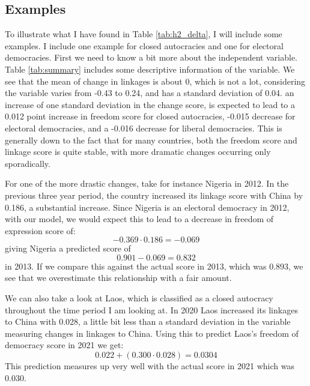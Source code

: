 \subsection{Examples}
To illustrate what I have found in Table \ref{tab:h2_delta}, I will include some examples. I include one example for closed autocracies and one for electoral democracies. First we need to know a bit more about the independent variable. Table \ref{tab:summary} includes some descriptive information of the variable. We see that the mean of change in linkages is about 0, which is not a lot, considering the variable varies from -0.43 to 0.24, and has a standard deviation of 0.04. an increase of one standard deviation in the change score, is expected to lead to a 0.012 point increase in freedom score for closed autocracies, -0.015 decrease for electoral democracies, and a -0.016 decrease for liberal democracies. This is generally down to the fact that for many countries, both the freedom score and linkage score is quite stable, with more dramatic changes occurring only sporadically. 

For one of the more drastic changes, take for instance Nigeria in 2012. In the previous three year period, the country increased its linkage score with China by 0.186, a substantial increase. Since Nigeria is an electoral democracy in 2012, with our model, we would expect this to lead to a decrease in freedom of expression score of:
\begin{equation} \label{nigeria_decrease}
    -0.369 \cdot 0.186 = -0.069
\end{equation}
giving Nigeria a predicted score of
\begin{equation} \label{nigeria_score}
    0.901 - 0.069 = 0.832
\end{equation}
in 2013. If we compare this against the actual score in 2013, which was 0.893, we see that we overestimate this relationship with a fair amount.

We can also take a look at Laos, which is classified as a closed autocracy throughout the time period I am looking at. In 2020 Laos increased its linkages to China with 0.028, a little bit less than a standard deviation in the variable measuring changes in linkages to China. Using this to predict Laos's freedom of democracy score in 2021 we get:
\begin{equation}
    0.022 + (0.300 \cdot 0.028) = 0.0304
\end{equation}
This prediction measures up very well with the actual score in 2021 which was 0.030.

